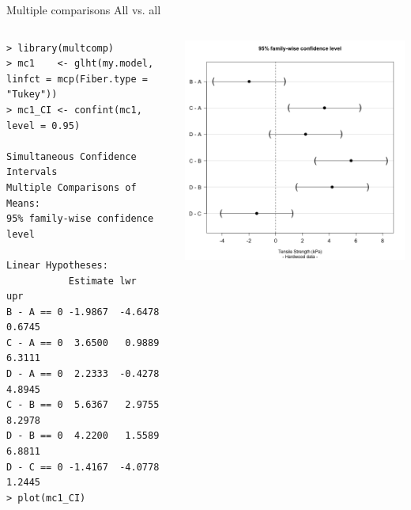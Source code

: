 \begin{frame}[fragile]
{Multiple comparisons}
{All vs. all}

\begin{columns}
{\smaller
\begin{verbatim}
> library(multcomp)
> mc1    <- glht(my.model, linfct = mcp(Fiber.type = "Tukey"))
> mc1_CI <- confint(mc1, level = 0.95)

Simultaneous Confidence Intervals
Multiple Comparisons of Means:
95% family-wise confidence level

Linear Hypotheses:
           Estimate lwr     upr
B - A == 0 -1.9867  -4.6478  0.6745
C - A == 0  3.6500   0.9889  6.3111
D - A == 0  2.2333  -0.4278  4.8945
C - B == 0  5.6367   2.9755  8.2978
D - B == 0  4.2200   1.5589  6.8811
D - C == 0 -1.4167  -4.0778  1.2445
> plot(mc1_CI)
\end{verbatim}}
\includegraphics[width=1\textwidth]{../img/papertukey.png}
\end{columns}
\end{frame}
%
%
